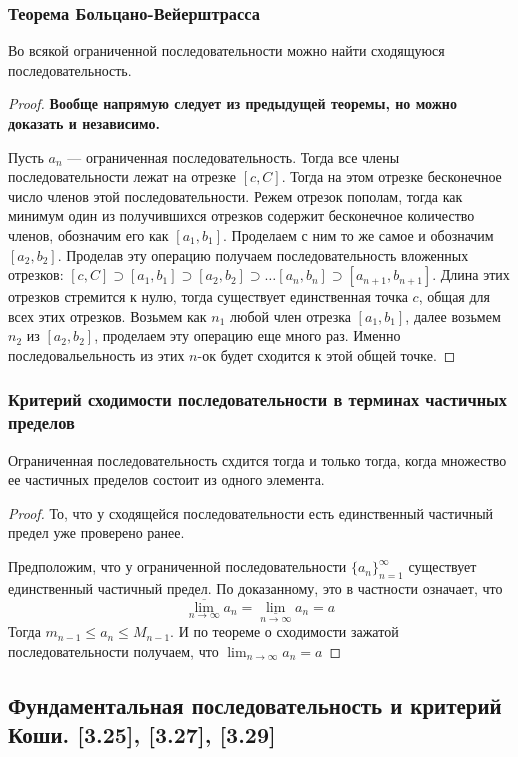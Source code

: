 \documentclass[12pt, a4paper]{article}
\begin{document}
    \subsubsection{Теорема Больцано-Вейерштрасса}
    Во всякой ограниченной последовательности можно найти сходящуюся последовательность. 
    \begin{proof}
    \textbf{Вообще напрямую следует из предыдущей теоремы, но можно доказать и независимо.}

    Пусть $a_n$ --- ограниченная последовательность. Тогда все члены последовательности лежат на отрезке $[c, C]$. Тогда на этом отрезке бесконечное число членов этой последовательности. Режем отрезок пополам, тогда как минимум один из получившихся отрезков содержит бесконечное количество членов, обозначим его как $[a_1, b_1]$. Проделаем с ним то же самое и обозначим $[a_2, b_2]$. Проделав эту операцию получаем последовательность вложенных отрезков: $[c, C] \supset [a_1, b_1] \supset [a_2, b_2] \supset \dots [a_n, b_n] \supset [a_{n+1}, b_{n+1}]$. Длина этих отрезков стремится к нулю, тогда существует единственная точка $c$, общая для всех этих отрезков. Возьмем как $n_1$ любой член отрезка $[a_1, b_1]$, далее возьмем $n_2$ из $[a_2, b_2]$, проделаем эту операцию еще много раз. Именно последовальельность из этих $n$-ок будет сходится к этой общей точке.
    \end{proof}
    \subsubsection{Критерий сходимости последовательности в терминах частичных пределов}
    Ограниченная последовательность схдится тогда и только тогда, когда множество ее частичных пределов состоит из одного элемента.
    \begin{proof}
    То, что у сходящейся последовательности есть единственный частичный предел уже проверено ранее.

    Предположим, что у ограниченной последовательности $\{a_n\}^{\infty}_{n=1}$ существует единственный частичный предел. По доказанному, это в частности означает, что
    \begin{equation*}
        \underset{n \to \infty}{\overline{\lim}} a_n = \underset{n \to \infty}{\underline{\lim}}a_n = a
    \end{equation*}
    Тогда $m_{n-1} \leq a_n \leq M_{n-1}$. И по теореме о сходимости зажатой последовательности получаем, что $\lim_{n \to \infty} a_n = a$
    \end{proof}
    \subsection{Фундаментальная последовательность и критерий Коши. [3.25], [3.27], [3.29]}
\end{document}
